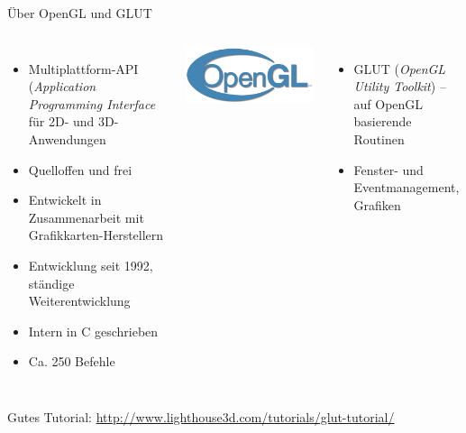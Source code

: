 
\begin{frame}[t,plain]
\titlepage
\end{frame}


\begin{frame}{Über OpenGL und GLUT}
%
\begin{columns}[T]
\begin{itemize}
\item Multiplattform-API (\emph{Application Programming Interface} für 2D- und 3D-Anwendungen
\item Quelloffen und frei
\item Entwickelt in Zusammenarbeit mit Grafikkarten-Herstellern
\item Entwicklung seit 1992, ständige Weiterentwicklung
\item Intern in C geschrieben
\item Ca. 250 Befehle
\end{itemize}
%
\vspace{-5pt}
\href{https://www.opengl.org/}{\includegraphics[width=\linewidth]{./gfx/OpenGL-Logo}}
\begin{itemize}
\item GLUT (\emph{OpenGL Utility Toolkit}) -- auf OpenGL basierende Routinen
\item Fenster- und Eventmanagement, Grafiken
\end{itemize}
\end{columns}
%
\vspace{15pt}
{\scriptsize Gutes Tutorial: \url{http://www.lighthouse3d.com/tutorials/glut-tutorial/}}
%
\end{frame}



